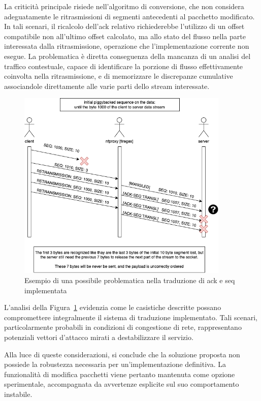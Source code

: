 La criticità principale risiede nell'algoritmo di conversione, che non considera adeguatamente le ritrasmissioni di segmenti antecedenti al pacchetto modificato. In tali scenari, il ricalcolo dell'\gls{ack} relativo richiederebbe l'utilizzo di un offset compatibile non all'ultimo offset calcolato, ma allo stato del flusso nella parte interessata dalla ritrasmissione, operazione che l'implementazione corrente non esegue. La problematica è diretta conseguenza della mancanza di un analisi del traffico contestuale, capace di identificare la porzione di flusso effettivamente coinvolta nella ritrasmissione, e di memorizzare le discrepanze cumulative associandole direttamente alle varie parti dello stream interessate.
\begin{figure}[H]
    \centering
    \includegraphics[width=0.90\textwidth]{images/chapter3/TCP_ack_seq_transl_failure.drawio.png}
    \caption{Esempio di una possibile problematica nella traduzione di \gls{ack} e \gls{seq} implementata}\label{fig:tcp_ack_seq_transl_failure}
\end{figure}
L'analisi della Figura~\ref{fig:tcp_ack_seq_transl_failure} evidenzia come le casistiche descritte possano compromettere integralmente il sistema di traduzione implementato. Tali scenari, particolarmente probabili in condizioni di congestione di rete, rappresentano potenziali vettori d'attacco mirati a destabilizzare il servizio.

Alla luce di queste considerazioni, si conclude che la soluzione proposta non possiede la robustezza necessaria per un'implementazione definitiva. La funzionalità di modifica pacchetti viene pertanto mantenuta come opzione sperimentale, accompagnata da avvertenze esplicite sul suo comportamento instabile.

